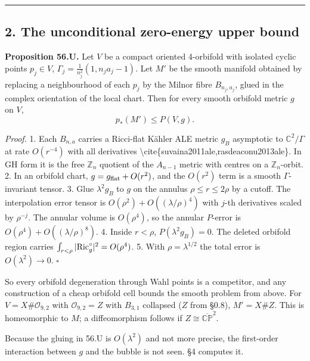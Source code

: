 \documentclass[
  10pt,
]{report}
\begin{document}
\begin{center}\rule{0.5\linewidth}{0.5pt}\end{center}

\hypertarget{the-unconditional-zero-energy-upper-bound}{%
\subsection{2. The unconditional zero-energy upper
bound}\label{the-unconditional-zero-energy-upper-bound}}

\textbf{Proposition 56.U.} Let \(V\) be a compact oriented 4-orbifold
with isolated cyclic points \(p_j\in V\),
\(\Gamma_j=\tfrac1{n_j^2}(1,n_ja_j-1)\). Let \(M'\) be the smooth
manifold obtained by replacing a neighbourhood of each \(p_j\) by the
Milnor fibre \(B_{n_j,a_j}\), glued in the complex orientation of the
local chart. Then for every smooth orbifold metric \(g\) on \(V\), \[
p_*(M')\le P(V,g).
\]

\emph{Proof.} 1. Each \(B_{n,a}\) carries a Ricci-flat Kähler ALE metric
\(g_B\) asymptotic to \(\mathbb C^2/\Gamma\) at rate \(O(r^{-4})\) with
all derivatives \textbackslash cite\{suvaina2011ale,rasdeaconu2013ale\}.
In GH form it is the free \(\mathbb Z_n\) quotient of the \(A_{n-1}\)
metric with centres on a \(\mathbb Z_n\)-orbit. 2. In an orbifold chart,
\(g=g_{\rm flat}+O(r^2)\), and the \(O(r^2)\) term is a smooth
\(\Gamma\)-invariant tensor. 3. Glue \(\lambda^2g_B\) to \(g\) on the
annulus \(\rho\le r\le2\rho\) by a cutoff. The interpolation error
tensor is \(O(\rho^2)+O((\lambda/\rho)^4)\) with \(j\)-th derivatives
scaled by \(\rho^{-j}\). The annular volume is \(O(\rho^4)\), so the
annular \(P\)-error is \(O(\rho^4)+O((\lambda/\rho)^8)\). 4. Inside
\(r<\rho\), \(P(\lambda^2g_B)=0\). The deleted orbifold region carries
\(\int_{r<\rho}|{\rm Ric}^\circ_g|^2=O(\rho^4)\). 5. With
\(\rho=\lambda^{1/2}\) the total error is \(O(\lambda^2)\to0\).
\(\square\)

So every orbifold degeneration through Wahl points is a competitor, and
any construction of a cheap orbifold cell bounds the smooth problem from
above. For \(V=X\#\mathcal O_{9,2}\) with \(\mathcal O_{9,2}=Z\) with
\(B_{3,1}\) collapsed (\(Z\) from §0.8), \(M'=X\#Z\). This is
homeomorphic to \(M\); a diffeomorphism follows if
\(Z\cong\overline{\mathbb{CP}}^2\).

Because the gluing in 56.U is \(O(\lambda^2)\) and not more precise, the
first-order interaction between \(g\) and the bubble is not seen. §4
computes it.
\end{document}
